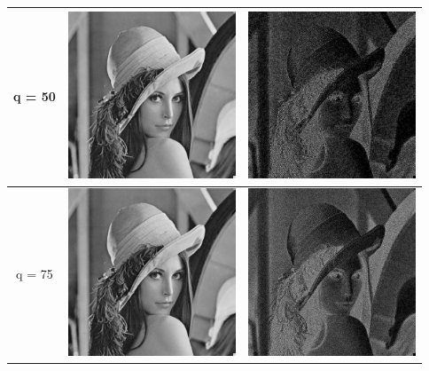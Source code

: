 \documentclass[a4paper,11pt]{article}
\begin{document}
\begin{tabular}{|c|c|c|}
   q = 50 & \includegraphics[width=5cm]{lena_q50.png} & \includegraphics[width=5cm]{lena_q50_diff.png} \\
   \hline
   q = 75 & \includegraphics[width=5cm]{lena_q75.png} & \includegraphics[width=5cm]{lena_q75_diff.png} \\
   \hline
  \end{tabular}

  
  
  
\end{document}
